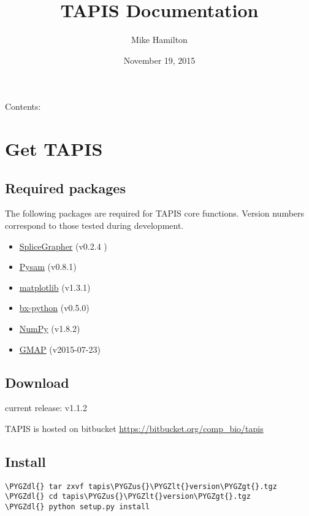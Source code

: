 \documentclass[letterpaper,10pt,english]{sphinxmanual}
\title{TAPIS Documentation}
\date{November 19, 2015}
\author{Mike Hamilton}
\def\PYGZus{\char`\_}
\def\PYGZlt{\char`\<}
\def\PYGZgt{\char`\>}
\def\PYGZdl{\char`\$}
\begin{document}
\maketitle
\tableofcontents
{}\label{index::doc}


Contents:


\chapter{Get TAPIS}
\label{installation:welcome-to-tapis-s-documentation}\label{installation::doc}\label{installation:get-tapis}

\section{Required packages}
\label{installation:required-packages}
The following packages are required for TAPIS core functions.
Version numbers correspond to those tested during development.
\begin{itemize}
\item {} 
\href{http://splicegrapher.sourceforge.net/}{SpliceGrapher} (v0.2.4 )

\item {} 
\href{https://code.google.com/p/pysam/}{Pysam} (v0.8.1)

\item {} 
\href{http://matplotlib.org/}{matplotlib} (v1.3.1)

\item {} 
\href{https://pypi.python.org/pypi/bx-python/0.7.3}{bx-python} (v0.5.0)

\item {} 
\href{http://www.numpy.org/}{NumPy} (v1.8.2)

\item {} 
\href{http://research-pub.gene.com/gmap/}{GMAP} (v2015-07-23)

\end{itemize}


\section{Download}
\label{installation:download}
current release: v1.1.2

TAPIS is hosted on bitbucket \href{https://bitbucket.org/comp\_bio/tapis}{https://bitbucket.org/comp\_bio/tapis}


\section{Install}
\label{installation:install}
\begin{Verbatim}[commandchars=\\\{\}]
\PYGZdl{} tar zxvf tapis\PYGZus{}\PYGZlt{}version\PYGZgt{}.tgz
\PYGZdl{} cd tapis\PYGZus{}\PYGZlt{}version\PYGZgt{}.tgz
\PYGZdl{} python setup.py install
\end{Verbatim}
\end{document}
